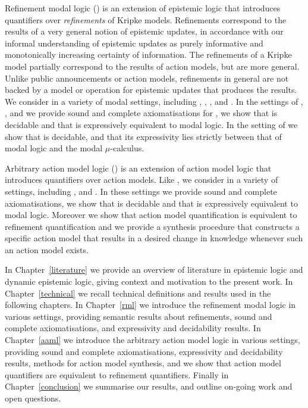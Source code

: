Refinement modal logic (\logicRml{}) is an extension of epistemic logic that introduces quantifiers over {\em refinements} of Kripke models.
Refinements correspond to the results of a very general notion of epistemic updates, in accordance with our informal understanding of epistemic updates as purely informative and monotonically increasing certainty of information.
The refinements of a Kripke model partially correspond to the results of action models, but are more general.
Unlike public announcements or action models, refinements in general are not backed by a model or operation for epistemic updates that produces the results.
We consider \logicRml{} in a variety of modal settings, including \classK{}, \classKF{}, \classKFF{}, \classKD{} and \classS{}.
In the settings of \classK{}, \classKFF{}, \classKD{} and \classS{} we provide sound and complete axiomatisations for \logicRml{}, we show that \logicRml{} is decidable and that \logicRml{} is expressively equivalent to modal logic.
In the setting of \classKF{} we show that \logicRml{} is decidable, and that its expressivity lies strictly between that of modal logic and the modal $\mu$-calculus.

Arbitrary action model logic (\logicAaml{}) is an extension of action model logic that introduces quantifiers over action models.
Like \logicRml{}, we consider \logicAaml{} in a variety of settings, including \classK{}, \classKFF{} and \classS{}.
In these settings we provide sound and complete axiomatisations, we show that \logicAaml{} is decidable and that \logicAaml{} is expressively equivalent to modal logic.
Moreover we show that action model quantification is equivalent to refinement quantification and we provide a synthesis procedure that constructs a specific action model that results in a desired change in knowledge whenever such an action model exists.

In Chapter~\ref{literature} we provide an overview of literature in epistemic logic and dynamic epistemic logic, giving context and motivation to the present work.
In Chapter~\ref{technical} we recall technical definitions and results used in the following chapters.
In Chapter~\ref{rml} we introduce the refinement modal logic in various settings, providing semantic results about refinements, sound and complete axiomatisations, and expressivity and decidability results.
In Chapter~\ref{aaml} we introduce the arbitrary action model logic in various settings, providing sound and complete axiomatisations, expressivity and decidability results, methods for action model synthesis, and we show that action model quantifiers are equivalent to refinement quantifiers.
Finally in Chapter~\ref{conclusion} we summarise our results, and outline on-going work and open questions.
